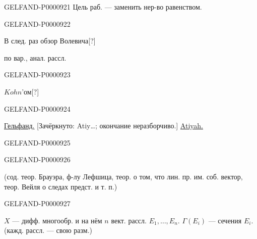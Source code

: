 \begin{GelfandAdjacentEvidence}{GELFAND-P000092}{1}
Цель раб. — заменить нер-во равенством.
\end{GelfandAdjacentEvidence}
\begin{GelfandAdjacentEvidence}{GELFAND-P000092}{2}

В след. раз обзор
Волевича[?]

по вар., анал. рассл.
\end{GelfandAdjacentEvidence}
\begin{GelfandAdjacentEvidence}{GELFAND-P000092}{3}

$Kohn$'ом[?]

\end{GelfandAdjacentEvidence}
\begin{GelfandAdjacentEvidence}{GELFAND-P000092}{4}


\underline{Гельфанд.}
[Зачёркнуто: Atiy…; окончание неразборчиво.] \underline{Atiyah.}

\end{GelfandAdjacentEvidence}
\begin{GelfandAdjacentEvidence}{GELFAND-P000092}{5}

\end{GelfandAdjacentEvidence}
\begin{GelfandAdjacentEvidence}{GELFAND-P000092}{6}

(сод. теор. Брауэра, ф-лу Лефшица, теор. о том, что лин. пр. им. соб. вектор,
теор. Вейля о следах предст. и т. п.)
\end{GelfandAdjacentEvidence}
\begin{GelfandAdjacentEvidence}{GELFAND-P000092}{7}

$X$ — дифф. многообр. и на нём $n$ вект. рассл. $E_1,\ldots,E_n$.
$\Gamma(E_i)$ — сечения $E_i$. (кажд. рассл. — свою разм.)
\end{GelfandAdjacentEvidence}
